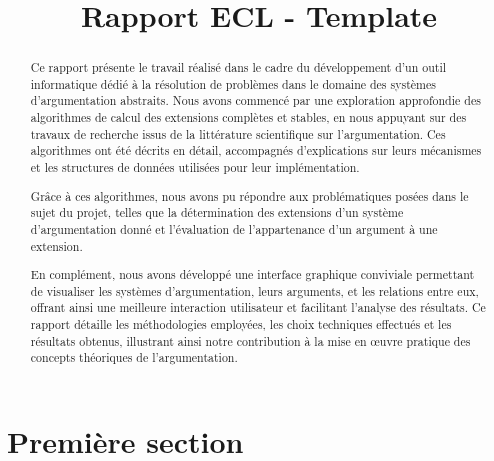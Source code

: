 \documentclass{rapportECL}
\title{Rapport ECL - Template} %
\begin{document}




        
\fairemarges %
\fairepagedegarde %
\tabledematieres %

\begin{abstract}
	Ce rapport présente le travail réalisé dans le cadre du développement d’un outil informatique dédié à la résolution de problèmes 
	dans le domaine des systèmes d’argumentation abstraits. Nous avons commencé par une exploration approfondie des algorithmes de 
	calcul des extensions complètes et stables, en nous appuyant sur des travaux de recherche issus de la littérature scientifique 
	sur l’argumentation. Ces algorithmes ont été décrits en détail, accompagnés d’explications sur leurs mécanismes et les structures 
	de données utilisées pour leur implémentation.

    Grâce à ces algorithmes, nous avons pu répondre aux problématiques posées dans le sujet du projet, telles que la détermination 
	des extensions d’un système d’argumentation donné et l’évaluation de l’appartenance d’un argument à une extension.

    En complément, nous avons développé une interface graphique conviviale permettant de visualiser les systèmes d’argumentation, 
	leurs arguments, et les relations entre eux, offrant ainsi une meilleure interaction utilisateur et facilitant l’analyse des 
	résultats. Ce rapport détaille les méthodologies employées, les choix techniques effectués et les résultats obtenus, illustrant 
	ainsi notre contribution à la mise en œuvre pratique des concepts théoriques de l’argumentation.
\end{abstract}

\newpage %


\section{Première section} 
\end{document}
